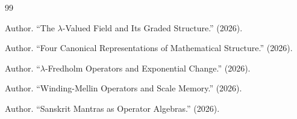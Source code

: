 \documentclass[12pt, reqno]{amsart}
\theoremstyle{plain}
\theoremstyle{definition}
\theoremstyle{remark}
\begin{document}
\begin{thebibliography}{99}

 Author. ``The $\lambda$-Valued Field and Its Graded Structure.'' (2026).

 Author. ``Four Canonical Representations of Mathematical Structure.'' (2026).

 Author. ``$\lambda$-Fredholm Operators and Exponential Change.'' (2026).

 Author. ``Winding-Mellin Operators and Scale Memory.'' (2026).

 Author. ``Sanskrit Mantras as Operator Algebras.'' (2026).

\end{thebibliography}
\end{document}
